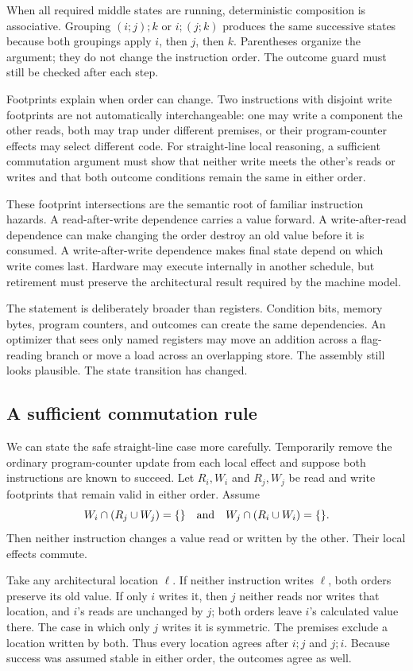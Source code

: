 When all required middle states are running, deterministic composition is
associative. Grouping \((i;j);k\) or \(i;(j;k)\) produces the same successive
states because both groupings apply \(i\), then \(j\), then \(k\). Parentheses
organize the argument; they do not change the instruction order. The outcome
guard must still be checked after each step.

Footprints explain when order can change. Two instructions with disjoint
write footprints are not automatically interchangeable: one may write a
component the other reads, both may trap under different premises, or their
program-counter effects may select different code. For straight-line local
reasoning, a sufficient commutation argument must show that neither write
meets the other's reads or writes and that both outcome conditions remain the
same in either order.

These footprint intersections are the semantic root of familiar instruction
hazards. A read-after-write
dependence carries a value forward. A write-after-read dependence can make
changing the order destroy an old value before it is consumed. A write-after-write
dependence makes final state depend on which write comes last. Hardware may
execute internally in another schedule, but retirement must preserve the
architectural result required by the machine model.

The statement is deliberately broader than registers. Condition bits,
memory bytes, program counters, and outcomes can create the same dependencies.
An optimizer that sees only named registers may move an addition across a
flag-reading branch or move a load across an overlapping store. The assembly
still looks plausible. The state transition has changed.

\subsection{A sufficient commutation rule}

We can state the safe straight-line case more carefully. Temporarily remove
the ordinary program-counter update from each local effect and suppose both
instructions are known to succeed. Let \(R_i,W_i\) and \(R_j,W_j\) be read and
write footprints that remain valid in either order. Assume
\[
 W_i\cap(R_j\cup W_j)=\{\}
 \quad\hbox{and}\quad
 W_j\cap(R_i\cup W_i)=\{\}.
\]
Then neither instruction changes a value read or written by the other. Their
local effects commute.

\begin{proofkit}[title={\iconProofKit\ Independent local effects commute}]
Take any architectural location \(\ell\). If neither instruction writes
\(\ell\), both orders preserve its old value. If only \(i\) writes it, then
\(j\) neither reads nor writes that location, and \(i\)'s reads are unchanged
by \(j\); both orders leave \(i\)'s calculated value there. The case in which
only \(j\) writes it is symmetric. The premises exclude a location written by
both. Thus every location agrees after \(i;j\) and \(j;i\). Because success
was assumed stable in either order, the outcomes agree as well.
\end{proofkit}

